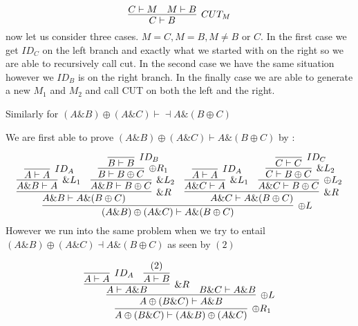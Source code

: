 \documentclass{article}
\begin{document}
\[
\infer[{CUT_M}]
{C \vdash B}
{C \vdash M & M \vdash B}
\]
now let us consider three cases. \(M = C , M = B , M \neq B \text{ or } C\). In the first case we get \(ID_C\) on the left branch and exactly what we started with on the right so we are able to recursively call cut. In the second case we have the same situation however we \(ID_B\) is on the right branch. In the finally case we are able to generate a new \(M_1\) and \(M_2\) and call CUT on both the left and the right.

Similarly for \((A \& B) \oplus ( A \& C ) \vdash \dashv A \& (B \oplus C)\)

We are first able to prove \((A \& B) \oplus ( A \& C ) \vdash A \& (B \oplus C)\) by :

\[
\infer[{ \oplus L}]
    {(A \& B) \oplus ( A \& C ) \vdash A \& (B \oplus C)}
    {
    \infer[{\& R}]
        { A \& B  \vdash A \& (B \oplus C)}
        {
        \infer[{\& L_1}]
            { A \& B \vdash A }
            {
            \infer[{ID_A}]
                {A \vdash A}
                {}
            }
        &
        \infer[{\& L_2}]
            { A \& B \vdash B \oplus C}
            {
            \infer[{\oplus R_1}]
                { B \vdash B \oplus C}
                {
                \infer[{ID_B}]
                    {B \vdash B}
                    {}
                }
            }
        }
    &
    \infer[{\& R}]
        { A \& C  \vdash A \& (B \oplus C)}
        {
        \infer[{\& L_1}]
            {A \& C  \vdash A }
            {
            \infer[{ID_A}]
                {A \vdash A}
                {}
            }
        &
        \infer[{\oplus L_2}]
            { A \& C  \vdash B \oplus C}
            {
            \infer[{ \& L_2}]
                { C  \vdash B \oplus C}
                {
                \infer[{ID_C}]
                    { C  \vdash  C}
                    {}
                }
            }
        }
    }
\]
However we run into the same problem when we try to entail \( (A \& B) \oplus ( A \& C ) \dashv A \& (B \oplus C) \) as seen by \((2)\)

\[
\infer[{\oplus R_1}]
    {A \oplus (B \& C) \vdash (A \& B) \oplus ( A \& C)}
    {
    \infer[{\oplus L}]
        {A \oplus (B \& C) \vdash A \& B }
        {
        \infer[{\& R}]
            {A \vdash A \& B}
            {
            \infer[{ID_A}]
                {A \vdash A }
                {}
            &
            \infer[{}]
                {A \vdash B }
                {(2)}
            }
        &
        B \& C \vdash A \& B
        }
    }
\]
\end{document}
